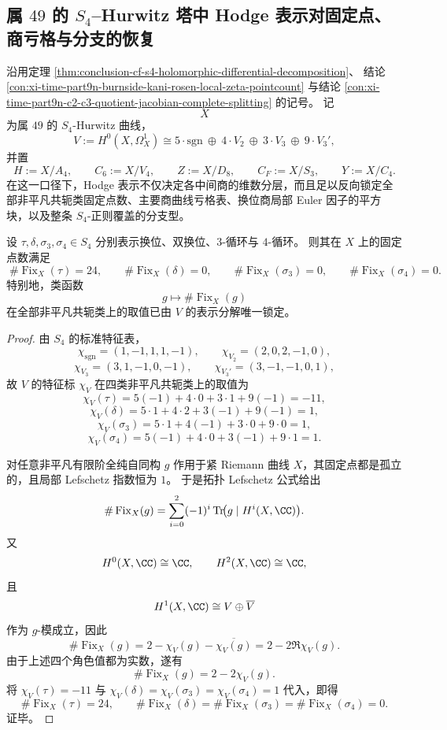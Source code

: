 \subsection{属 \texorpdfstring{$49$}{49} 的 \texorpdfstring{$S_4$}{S4}--Hurwitz 塔中 Hodge 表示对固定点、商亏格与分支的恢复}\label{subsec:conclusion-s4-hodge-fixedpoint-branch-euler-recovery}
沿用定理 \ref{thm:conclusion-cf-s4-holomorphic-differential-decomposition}、
结论 \ref{con:xi-time-part9n-burnside-kani-rosen-local-zeta-pointcount} 与结论 \ref{con:xi-time-part9n-c2-c3-quotient-jacobian-complete-splitting} 的记号。
记
\[
X
\]
为属 \(49\) 的 \(S_4\)-Hurwitz 曲线，
\[
V:=H^0(X,\Omega_X^1)
\cong
5\cdot \mathrm{sgn}\ \oplus\ 4\cdot V_2\ \oplus\ 3\cdot V_3\ \oplus\ 9\cdot V_3',
\]
并置
\[
H:=X/A_4,\qquad
C_6:=X/V_4,\qquad
Z:=X/D_8,\qquad
C_F:=X/S_3,\qquad
Y:=X/C_4.
\]
在这一口径下，Hodge 表示不仅决定各中间商的维数分层，而且足以反向锁定全部非平凡共轭类固定点数、主要商曲线亏格表、换位商局部 Euler 因子的平方块，以及整条 \(S_4\)-正则覆盖的分支型。

\begin{theorem}\label{thm:conclusion-s4-hodge-determines-fixedpoint-counts}
设 \(\tau,\delta,\sigma_3,\sigma_4\in S_4\) 分别表示换位、双换位、\(3\)-循环与 \(4\)-循环。
则其在 \(X\) 上的固定点数满足
\[
\boxed{\;
\#\operatorname{Fix}_X(\tau)=24,\qquad
\#\operatorname{Fix}_X(\delta)=0,\qquad
\#\operatorname{Fix}_X(\sigma_3)=0,\qquad
\#\operatorname{Fix}_X(\sigma_4)=0.\;}
\]
特别地，类函数
\[
g\longmapsto \#\operatorname{Fix}_X(g)
\]
在全部非平凡共轭类上的取值已由 \(V\) 的表示分解唯一锁定。
\end{theorem}
\begin{proof}
由 \(S_4\) 的标准特征表，
\[
\chi_{\mathrm{sgn}}=(1,-1,1,1,-1),\qquad
\chi_{V_2}=(2,0,2,-1,0),
\]
\[
\chi_{V_3}=(3,1,-1,0,-1),\qquad
\chi_{V_3'}=(3,-1,-1,0,1),
\]
故 \(V\) 的特征标 \(\chi_V\) 在四类非平凡共轭类上的取值为
\[
\chi_V(\tau)=5(-1)+4\cdot 0+3\cdot 1+9(-1)=-11,
\]
\[
\chi_V(\delta)=5\cdot 1+4\cdot 2+3(-1)+9(-1)=1,
\]
\[
\chi_V(\sigma_3)=5\cdot 1+4(-1)+3\cdot 0+9\cdot 0=1,
\]
\[
\chi_V(\sigma_4)=5(-1)+4\cdot 0+3(-1)+9\cdot 1=1.
\]

对任意非平凡有限阶全纯自同构 \(g\) 作用于紧 Riemann 曲线 \(X\)，其固定点都是孤立的，且局部 Lefschetz 指数恒为 \(1\)。
于是拓扑 Lefschetz 公式给出
\[
\#\operatorname{Fix}_X(g)
=
\sum_{i=0}^{2}(-1)^i\operatorname{Tr}\!\bigl(g\mid H^i(X,\CC)\bigr).
\]
又
\[
H^0(X,\CC)\cong \CC,\qquad
H^2(X,\CC)\cong \CC,
\]
且
\[
H^1(X,\CC)\cong V\oplus \overline V
\]
作为 \(g\)-模成立，因此
\[
\#\operatorname{Fix}_X(g)
=
2-\chi_V(g)-\overline{\chi_V(g)}
=
2-2\Re\chi_V(g).
\]
由于上述四个角色值都为实数，遂有
\[
\#\operatorname{Fix}_X(g)=2-2\chi_V(g).
\]
将 \(\chi_V(\tau)=-11\) 与
\(
\chi_V(\delta)=\chi_V(\sigma_3)=\chi_V(\sigma_4)=1
\)
代入，即得
\[
\#\operatorname{Fix}_X(\tau)=24,
\qquad
\#\operatorname{Fix}_X(\delta)=\#\operatorname{Fix}_X(\sigma_3)=\#\operatorname{Fix}_X(\sigma_4)=0.
\]
证毕。
\end{proof}

